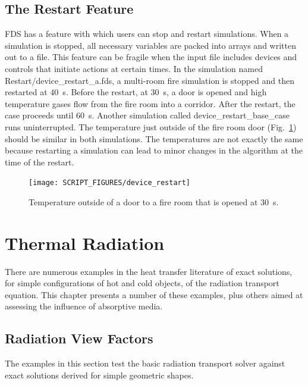 \documentclass[11pt]{book}
\begin{document}
\newpage

\section{The Restart Feature}
\label{device_restart}

FDS has a feature with which users can stop and restart simulations. When a simulation is stopped, all necessary variables are packed into arrays and written out to a file. This feature can be fragile when the input file includes devices and controls that initiate actions at certain times. In the simulation named {\ct Restart/device\_restart\_a.fds}, a multi-room fire simulation is stopped and then restarted at 40~s. Before the restart, at 30~s, a door is opened and high temperature gases flow from the fire room into a corridor. After the restart, the case proceeds until 60~s. Another simulation called {\ct device\_restart\_base\_case} runs uninterrupted. The temperature just outside of the fire room door (Fig.~\ref{device_restart_fig}) should be similar in both simulations. The temperatures are not exactly the same because restarting a simulation can lead to minor changes in the algorithm at the time of the restart. 

\begin{figure}[!ht]
\centering
\texttt{[image: SCRIPT\_FIGURES/device\_restart]}
\caption[Result of the  test case]{Temperature outside of a door to a fire room that is opened at 30~s.}
\label{device_restart_fig}
\end{figure}


\chapter{Thermal Radiation}

There are numerous examples in the heat transfer literature of exact solutions, for simple configurations of hot and cold objects, of the radiation transport equation. This chapter presents a number of these examples, plus others aimed at assessing the influence of absorptive media.

\section{Radiation View Factors}

The examples in this section test the basic radiation transport solver against exact solutions derived for simple geometric shapes.
\end{document}
